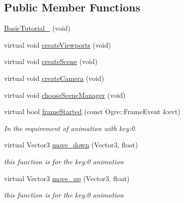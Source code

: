 \subsection*{Public Member Functions}
\begin{DoxyCompactItemize}
\item 
\hyperlink{class_basic_tutorial__00_a6b55068822076b28e7819b1878e95684}{Basic\+Tutorial\+\_} (void)
\item 
virtual void \hyperlink{class_basic_tutorial__00_adc2454d9f8226e0958ecf702f355846e}{create\+Viewports} (void)
\item 
virtual void \hyperlink{class_basic_tutorial__00_a15a3d4673724ec99077ce992f996a550}{create\+Scene} (void)
\item 
virtual void \hyperlink{class_basic_tutorial__00_a1bf709417d654dffc2ea10987412b912}{create\+Camera} (void)
\item 
virtual void \hyperlink{class_basic_tutorial__00_aba97a29d983586d2dc8e108d3bccf721}{choose\+Scene\+Manager} (void)
\item 
virtual bool \hyperlink{class_basic_tutorial__00_a94e281a96584a25bf57b1c5e73737c81}{frame\+Started} (const Ogre\+::\+Frame\+Event \&evt)
\begin{DoxyCompactList}\small\item\em In the requirement of animation with key\+:0. \end{DoxyCompactList}\item 
virtual Vector3 \hyperlink{class_basic_tutorial__00_a90e8fc0b5789c3897a87b08e45bf6fe0}{move\+\_\+down} (Vector3, float)
\begin{DoxyCompactList}\small\item\em this function is for the key\+:0 animation \end{DoxyCompactList}\item 
virtual Vector3 \hyperlink{class_basic_tutorial__00_a3bec198c9f41ab006a1193311dfb4e0b}{move\+\_\+up} (Vector3, float)
\begin{DoxyCompactList}\small\item\em this function is for the key\+:0 animation \end{DoxyCompactList}\end{DoxyCompactItemize}
